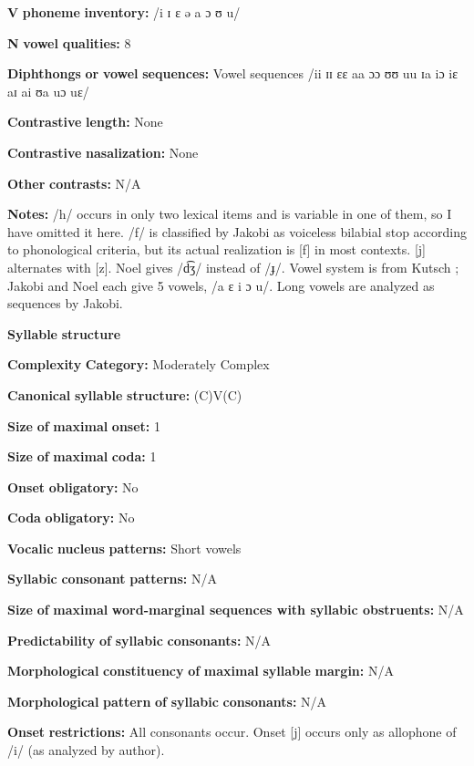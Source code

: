 \textbf{V} \textbf{phoneme} \textbf{inventory:} /i ɪ ɛ ə a ɔ ʊ u/

\textbf{N} \textbf{vowel} \textbf{qualities:} 8

\textbf{Diphthongs} \textbf{or} \textbf{vowel} \textbf{sequences:} Vowel sequences /ii ɪɪ ɛɛ aa ɔɔ ʊʊ uu ɪa iɔ iɛ aɪ ai ʊa uɔ uɛ/

\textbf{Contrastive} \textbf{length:} None

\textbf{Contrastive} \textbf{nasalization:} None

\textbf{Other} \textbf{contrasts:} N/A

\textbf{Notes:} /h/ occurs in only two lexical items and is variable in one of them, so I have omitted it here. /f/ is classified by Jakobi as voiceless bilabial stop according to phonological criteria, but its actual realization is [f] in most contexts. [j] alternates with [z]. Noel gives /d͡ʒ/ instead of /ɟ/. Vowel system is from Kutsch \citet{LojengaWaag2004}; Jakobi and Noel each give 5 vowels, /a ɛ i ɔ u/. Long vowels are analyzed as sequences by Jakobi.

\textbf{Syllable} \textbf{structure}

\textbf{Complexity} \textbf{Category:} Moderately Complex

\textbf{Canonical} \textbf{syllable} \textbf{structure:} (C)V(C) \citep[53-8]{Jakobi1990}

\textbf{Size} \textbf{of} \textbf{maximal} \textbf{onset:} 1

\textbf{Size} \textbf{of} \textbf{maximal} \textbf{coda:} 1

\textbf{Onset} \textbf{obligatory:} No

\textbf{Coda} \textbf{obligatory:} No

\textbf{Vocalic} \textbf{nucleus} \textbf{patterns:} Short vowels

\textbf{Syllabic} \textbf{consonant} \textbf{patterns:} N/A

\textbf{Size} \textbf{of} \textbf{maximal} \textbf{word{}-marginal sequences with syllabic obstruents:} N/A

\textbf{Predictability} \textbf{of} \textbf{syllabic} \textbf{consonants:} N/A

\textbf{Morphological} \textbf{constituency} \textbf{of} \textbf{maximal} \textbf{syllable} \textbf{margin:} N/A

\textbf{Morphological} \textbf{pattern} \textbf{of} \textbf{syllabic} \textbf{consonants:} N/A

\textbf{Onset} \textbf{restrictions:} All consonants occur. Onset [j] occurs only as allophone of /i/ (as analyzed by author).

